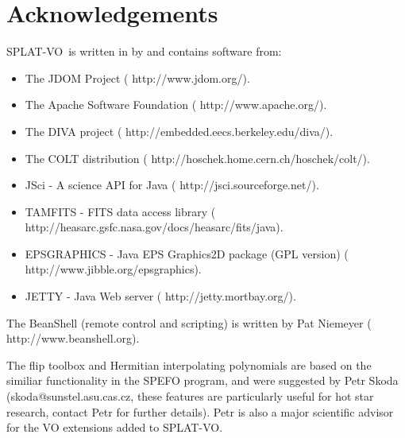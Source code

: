 \documentclass[twoside,11pt,nolof]{starlink}
\providecommand{\SPLAT}{\textsf{SPLAT-VO}}
\begin{document}
\newpage
\section{Acknowledgements}

\SPLAT\ is written in
 by
 and
contains software from:
\begin{itemize}
\item The JDOM Project (
                                          {http://www.jdom.org/}).
\item The Apache Software Foundation
      (
                         {http://www.apache.org/}).
\item The DIVA project
      (
                         {http://embedded.eecs.berkeley.edu/diva/}).
\item The COLT distribution
      (
                         {http://hoschek.home.cern.ch/hoschek/colt/}).
\item JSci - A science API for Java
      (
                         {http://jsci.sourceforge.net/}).
\item TAMFITS - FITS data access library
      (
                         {http://heasarc.gsfc.nasa.gov/docs/heasarc/fits/java}).
\item EPSGRAPHICS - Java EPS Graphics2D package (GPL version)
      (
                         {http://www.jibble.org/epsgraphics}).
\item JETTY - Java Web server
      (
                         {http://jetty.mortbay.org/}).
\end{itemize}

The BeanShell (remote control and scripting) is written by Pat
Niemeyer (
                            {http://www.beanshell.org}).

The flip toolbox and Hermitian interpolating polynomials are based on the
similiar functionality in the SPEFO program, and were suggested by Petr Skoda
(skoda@sunstel.asu.cas.cz, these features are particularly useful for hot star
research, contact Petr for further details). Petr is also a major scientific
advisor for the VO extensions added to \SPLAT.
\end{document}

